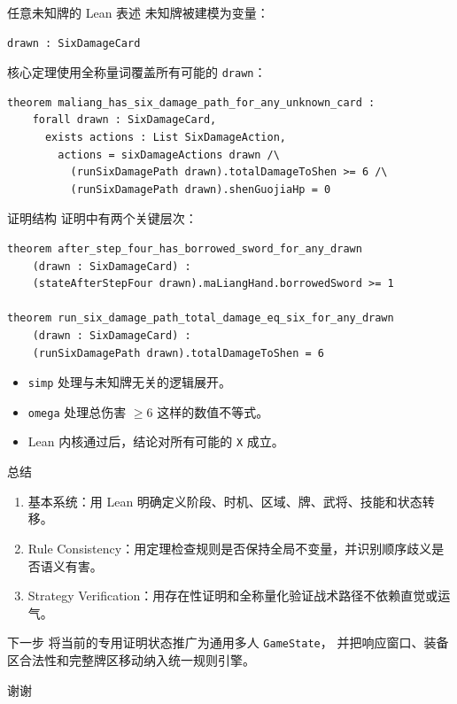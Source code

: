 \documentclass[UTF8,aspectratio=169]{ctexbeamer}
\newcommand{\code}[1]{\texttt{#1}}
\begin{document}
\begin{frame}[fragile]{任意未知牌的 Lean 表述}
  未知牌被建模为变量：

  \begin{verbatim}
drawn : SixDamageCard
  \end{verbatim}

  核心定理使用全称量词覆盖所有可能的 \code{drawn}：

  \begin{verbatim}
theorem maliang_has_six_damage_path_for_any_unknown_card :
    forall drawn : SixDamageCard,
      exists actions : List SixDamageAction,
        actions = sixDamageActions drawn /\
          (runSixDamagePath drawn).totalDamageToShen >= 6 /\
          (runSixDamagePath drawn).shenGuojiaHp = 0
  \end{verbatim}
\end{frame}

\begin{frame}[fragile]{证明结构}
  证明中有两个关键层次：

  \begin{verbatim}
theorem after_step_four_has_borrowed_sword_for_any_drawn
    (drawn : SixDamageCard) :
    (stateAfterStepFour drawn).maLiangHand.borrowedSword >= 1

theorem run_six_damage_path_total_damage_eq_six_for_any_drawn
    (drawn : SixDamageCard) :
    (runSixDamagePath drawn).totalDamageToShen = 6
  \end{verbatim}

  \begin{itemize}
    \item \code{simp} 处理与未知牌无关的逻辑展开。
    \item \code{omega} 处理总伤害 $\ge 6$ 这样的数值不等式。
    \item Lean 内核通过后，结论对所有可能的 \code{X} 成立。
  \end{itemize}
\end{frame}

\begin{frame}{总结}
  \begin{enumerate}
    \item 基本系统：用 Lean 明确定义阶段、时机、区域、牌、武将、技能和状态转移。
    \item Rule Consistency：用定理检查规则是否保持全局不变量，并识别顺序歧义是否语义有害。
    \item Strategy Verification：用存在性证明和全称量化验证战术路径不依赖直觉或运气。
  \end{enumerate}

  \begin{block}{下一步}
    将当前的专用证明状态推广为通用多人 \code{GameState}，
    并把响应窗口、装备区合法性和完整牌区移动纳入统一规则引擎。
  \end{block}
\end{frame}

\begin{frame}
  \centering
  \vfill
  {\Huge 谢谢}
  \vfill
\end{frame}
\end{document}
